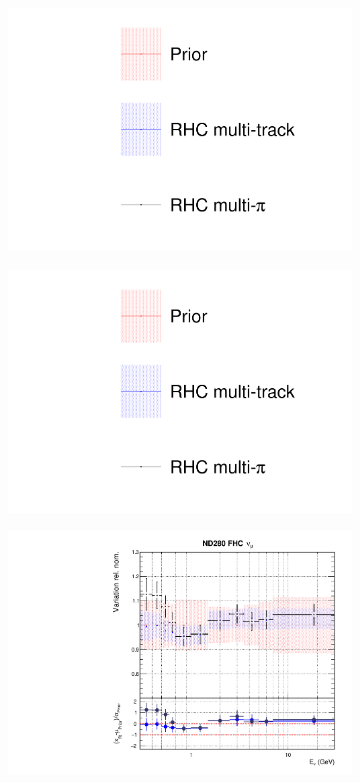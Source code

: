 \begin{figure}[t]
\centering
\begin{subfigure}{0.3\textwidth}
  \centering
  \includegraphics[width=1.0\linewidth, trim={5mm  130mm 0mm 10mm}, clip]{figs/rhcmpdat248_leg}	
\end{subfigure}
\begin{subfigure}{0.3\textwidth}
  \centering
  \includegraphics[width=1.0\linewidth, trim={5mm  0mm 0mm 70mm}, clip]{figs/rhcmpdat248_leg}	
\end{subfigure}
\begin{subfigure}{0.45\textwidth}
  \centering
  \includegraphics[width=0.75\linewidth]{figs/rhcmpdat28flux_0}

\end{subfigure}
\end{figure}
